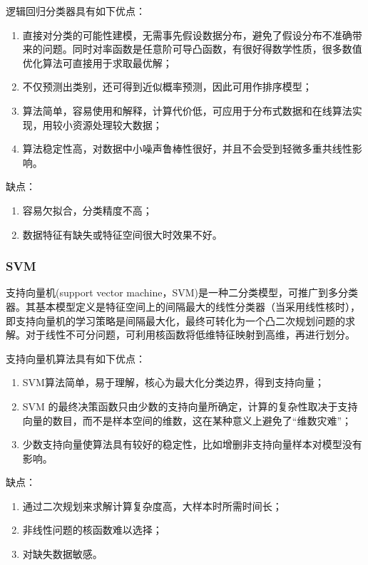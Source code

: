 \documentclass[UTF8]{ctexart}
\begin{document}
逻辑回归分类器具有如下优点：
\begin{enumerate}[(1)]
	\item 直接对分类的可能性建模，无需事先假设数据分布，避免了假设分布不准确带来的问题。同时对率函数是任意阶可导凸函数，有很好得数学性质，很多数值优化算法可直接用于求取最优解；
	\item 不仅预测出类别，还可得到近似概率预测，因此可用作排序模型；
	\item 算法简单，容易使用和解释，计算代价低，可应用于分布式数据和在线算法实现，用较小资源处理较大数据；
	\item 算法稳定性高，对数据中小噪声鲁棒性很好，并且不会受到轻微多重共线性影响。
\end{enumerate}

缺点：
\begin{enumerate}[(1)]
	\item 容易欠拟合，分类精度不高；
	\item 数据特征有缺失或特征空间很大时效果不好。
\end{enumerate}


\subsubsection{SVM}
支持向量机(support vector machine，SVM)是一种二分类模型，可推广到多分类器。其基本模型定义是特征空间上的间隔最大的线性分类器（当采用线性核时），即支持向量机的学习策略是间隔最大化，最终可转化为一个凸二次规划问题的求解。对于线性不可分问题，可利用核函数将低维特征映射到高维，再进行划分。

支持向量机算法具有如下优点：
\begin{enumerate}[(1)]
	\item SVM算法简单，易于理解，核心为最大化分类边界，得到支持向量；
	\item SVM 的最终决策函数只由少数的支持向量所确定，计算的复杂性取决于支持向量的数目，而不是样本空间的维数，这在某种意义上避免了“维数灾难”；
	\item 少数支持向量使算法具有较好的稳定性，比如增删非支持向量样本对模型没有影响。
\end{enumerate}

缺点：
\begin{enumerate}[(1)]
	\item 通过二次规划来求解计算复杂度高，大样本时所需时间长；
	\item 非线性问题的核函数难以选择；
	\item 对缺失数据敏感。
\end{enumerate}
\end{document}
